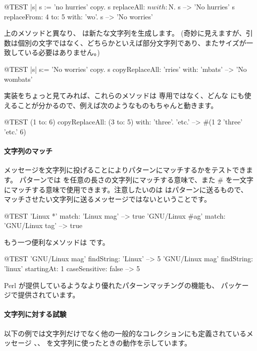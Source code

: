 \documentclass[a4paper,10pt,twoside]{book}
\begin{document}
\begin{code}{@TEST |s| s := 'no hurries' copy.}
s replaceAll: $n with: $N.
s --> 'No hurries'
s replaceFrom: 4 to: 5 with: 'wo'.
s --> 'No worries'
\end{code}

上のメソッドと異なり、 は新たな文字列を生成します。
(奇妙に見えますが、引数は個別の文字ではなく、どちらかといえば部分文字列であり、またサイズが一致している必要はありません。)

\begin{code}{@TEST |s| s:= 'No worries' copy.}
s copyReplaceAll: 'rries' with: 'mbats' --> 'No wombats'
\end{code}

実装をちょっと見てみれば、これらのメソッドは  専用ではなく、どんな  にも使えることが分かるので、例えば次のようなものもちゃんと動きます。

\begin{code}{@TEST}
(1 to: 6) copyReplaceAll: (3 to: 5) with: { 'three'. 'etc.' } --> #(1 2 'three' 'etc.' 6)
\end{code}

\paragraph{文字列のマッチ}
 メッセージを文字列に投げることによりパターンにマッチするかをテストできます。
パターンでは \ct{*} を任意の長さの文字列にマッチする意味で、また \# を一文字にマッチする意味で使用できます。注意したいのは  はパターンに送るもので、マッチさせたい文字列に送るメッセージではないということです。
\begin{code}{@TEST}
'Linux *' match: 'Linux mag'                      --> true
'GNU/Linux #ag' match: 'GNU/Linux tag' --> true
\end{code}

もう一つ便利なメソッドは  です。
\begin{code}{@TEST}
'GNU/Linux mag' findString: 'Linux'                                                      --> 5
'GNU/Linux mag' findString: 'linux' startingAt: 1 caseSensitive: false  --> 5
\end{code}

Perl が提供しているようなより優れたパターンマッチングの機能も、 パッケージで提供されています。

\paragraph{文字列に対する試験} 以下の例では文字列だけでなく他の一般的なコレクションにも定義されているメッセージ \mbox{、}、 を文字列に使ったときの動作を示しています。
\end{document}
